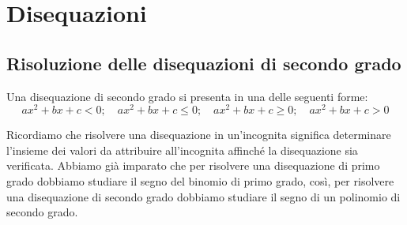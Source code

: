 
%   

% 
%   

% 

\chapter{Disequazioni}

\section{Risoluzione delle disequazioni di secondo grado}
\label{sec:diseq_secondo_grado}

Una disequazione di secondo grado si presenta in una delle seguenti forme:
\[ax^2+bx+c<0;\quad ax^2+bx+c\le 0;\quad ax^2+bx+c\ge0;\quad ax^2+bx+c> 0\]

Ricordiamo che risolvere una disequazione in un'incognita significa determinare 
l'insieme dei valori da attribuire all'incognita affinché la disequazione sia 
verificata.
Abbiamo già imparato che per risolvere una disequazione di primo grado dobbiamo 
studiare il segno del binomio di primo grado, così, per risolvere una 
disequazione di secondo grado dobbiamo studiare il segno di un polinomio di 
secondo grado.

